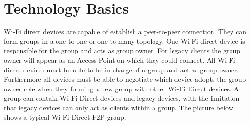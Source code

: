 \section{Technology Basics}
\label{sec:TechnologyBascs}
Wi-Fi direct devices are capable of establish a peer-to-peer connection. They can form groups in a one-to-one or one-to-many topology. One Wi-Fi direct device is responsible for the group and acts as group owner. For legacy clients the group owner will appear as an Access Point on which they could connect.
All Wi-Fi direct devices must be able to be in charge of a group and act as group owner. Furthermore all devices must be able to negotiate which device adopts the group owner role when they forming a new group with other Wi-Fi Direct devices. A group can contain Wi-Fi Direct devices and legacy devices, with the limitation that legacy devices can only act as clients within a group. The picture below shows a typical Wi-Fi Direct P2P group.